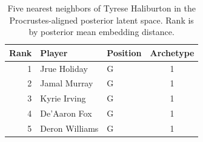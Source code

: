 \begin{table}[htbp]
  \centering\small
  \begin{tabular}{rllc}
    \toprule
    Rank & Player & Position & Archetype \\
    \midrule
    1 & Jrue Holiday & G & 1 \\
    2 & Jamal Murray & G & 1 \\
    3 & Kyrie Irving & G & 1 \\
    4 & De'Aaron Fox & G & 1 \\
    5 & Deron Williams & G & 1 \\
    \bottomrule
  \end{tabular}
  \caption{Five nearest neighbors of Tyrese Haliburton in the Procrustes-aligned posterior latent space. Rank is by posterior mean embedding distance.}
  \label{tab:Tyrese_Haliburton_neighbors}
\end{table}

